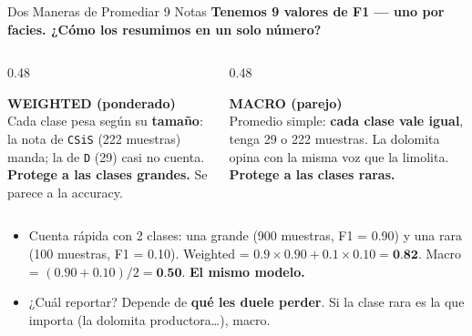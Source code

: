 \documentclass[aspectratio=169, 11pt]{beamer}
\begin{document}
\begin{frame}[shrink=8]{Dos Maneras de Promediar 9 Notas}
  \vspace{-4pt}
  {\small\color{arcaDark}\bfseries
    Tenemos 9 valores de F1 --- uno por facies. ¿Cómo los resumimos en un solo número?}

  \vspace{8pt}
  \begin{columns}[T]
    \begin{column}{0.48\textwidth}
      \begin{tcolorbox}[colback=arcaGray, colframe=codeBlue, boxrule=0pt, leftrule=3pt,
        arc=3pt, left=6pt, right=6pt, top=5pt, bottom=5pt]
        {\scriptsize\color{codeBlue}\bfseries\faBalanceScale\hspace{4pt}WEIGHTED (ponderado)}\\[4pt]
        {\scriptsize\color{textMuted}
          Cada clase pesa según su \textbf{tamaño}: la nota de
          \texttt{CSiS} (222 muestras) manda; la de \texttt{D}
          (29) casi no cuenta.\\[3pt]
          \textbf{Protege a las clases grandes.} Se parece a la accuracy.}
      \end{tcolorbox}
    \end{column}
    \begin{column}{0.48\textwidth}
      \begin{tcolorbox}[colback=arcaGray, colframe=arcaRed, boxrule=0pt, leftrule=3pt,
        arc=3pt, left=6pt, right=6pt, top=5pt, bottom=5pt]
        {\scriptsize\color{arcaRed}\bfseries\faBalanceScale\hspace{4pt}MACRO (parejo)}\\[4pt]
        {\scriptsize\color{textMuted}
          Promedio simple: \textbf{cada clase vale igual},
          tenga 29 o 222 muestras. La dolomita opina
          con la misma voz que la limolita.\\[3pt]
          \textbf{Protege a las clases raras.}}
      \end{tcolorbox}
    \end{column}
  \end{columns}

  \vspace{10pt}
  {\footnotesize\color{textMuted}
  \begin{itemize}\setlength{\itemsep}{4pt}
    \item[{\color{arcaRed}\scriptsize\faCalculator}]
      Cuenta rápida con 2 clases: una grande (900 muestras, F1 = 0.90) y una rara
      (100 muestras, F1 = 0.10). Weighted = \(0.9\times0.90 + 0.1\times0.10 = \textbf{0.82}\).
      Macro = \((0.90+0.10)/2 = \textbf{0.50}\). \textbf{El mismo modelo.}
    \item[{\color{arcaRed}\scriptsize\faArrowRight}]
      ¿Cuál reportar? Depende de \textbf{qué les duele perder}. Si la clase rara es
      la que importa (la dolomita productora\ldots), macro.
  \end{itemize}
  }
\end{frame}
\end{document}
